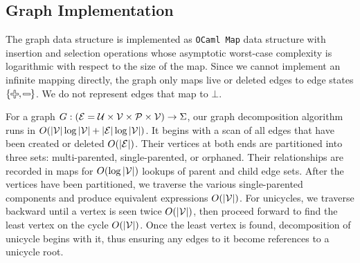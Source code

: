 
\subsection{Graph Implementation}
\label{sec: Graph Implementation}
The graph data structure is implemented as \texttt{OCaml Map} data structure with insertion and selection operations whose asymptotic worst-case complexity is logarithmic with respect to the size of the map. Since we cannot implement an infinite mapping directly, the graph only maps live or deleted edges to edge states $\left\{\Plus, \Minus\right\}$. We do not represent edges that map to $\bot$.

For a graph $G : (\mathcal{E} = \mathcal{U} \times \mathcal{V} \times \mathcal{P} \times \mathcal{V}) \to \Sigma$, our graph decomposition algorithm runs in $O(\left\lvert\mathcal{V}\right\rvert \log \left\lvert\mathcal{V}\right\rvert + \left\lvert\mathcal{E}\right\rvert \log \left\lvert\mathcal{V}\right\rvert)$.
It begins with a scan of all edges that have been created or deleted $O(\left\lvert\mathcal{E}\right\rvert)$.
Their vertices at both ends are partitioned into three sets: multi-parented, single-parented, or orphaned.
Their relationships are recorded in maps for $O(\log \left\lvert\mathcal{V}\right\rvert)$ lookups of parent and child edge sets.
After the vertices have been partitioned, we traverse the various single-parented components and produce equivalent expressions $O(\left\lvert\mathcal{V}\right\rvert)$.
For unicycles, we traverse backward until a vertex is seen twice $O(\left\lvert\mathcal{V}\right\rvert)$, then proceed forward to find the least vertex on the cycle $O(\left\lvert\mathcal{V}\right\rvert)$. Once the least vertex is found, decomposition of unicycle begins with it, thus ensuring any edges to it become references to a unicycle root.







